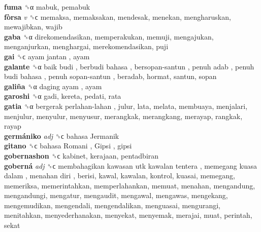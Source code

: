 \textbf{fuma} ␝α  mabuk, pemabuk  \\
\textbf{fòrsa} \emph{v}  ␝ϲ  memaksa, memaksakan, mendesak, menekan, mengharuskan, mewajibkan, wajib  \\
\textbf{gaba} ␝α  direkomendasikan, memperakukan, memuji, mengajukan, menganjurkan, menghargai, merekomendasikan, puji  \\
\textbf{gai} ␝ϲ   ayam jantan , ayam  \\
\textbf{galante} ␝α   baik budi ,  berbudi bahasa ,  bersopan-santun ,  penuh adab ,  penuh budi bahasa ,  penuh sopan-santun , beradab, hormat, santun, sopan  \\
\textbf{galiña} ␝α   daging ayam , ayam  \\
\textbf{garoshi} ␝α  gadi, kereta, pedati, rata  \\
\textbf{gatia} ␝α   bergerak perlahan-lahan , julur, lata, melata, membuaya, menjalari, menjulur, menyulur, menyusur, merangkak, merangkang, merayap, rangkak, rayap  \\
\textbf{germániko} \emph{adj}  ␝ϲ   bahasa Jermanik   \\
\textbf{gitano} ␝ϲ   bahasa Romani ,  Gipsi , gipsi  \\
\textbf{gobernashon} ␝ϲ  kabinet, kerajaan, pentadbiran  \\
\textbf{goberná} \emph{adj}  ␝ϲ   membahagikan kawasan utk kawalan tentera ,  memegang kuasa dalam ,  menahan diri , berisi, kawal, kawalan, kontrol, kuasai, memegang, memeriksa, memerintahkan, memperlahankan, memuat, menahan, mengandung, mengandungi, mengatur, mengaudit, mengawal, mengawas, mengekang, mengemudikan, mengendali, mengendalikan, menguasai, mengurangi, menitahkan, menyederhanakan, menyekat, menyemak, merajai, muat, perintah, sekat  \\
